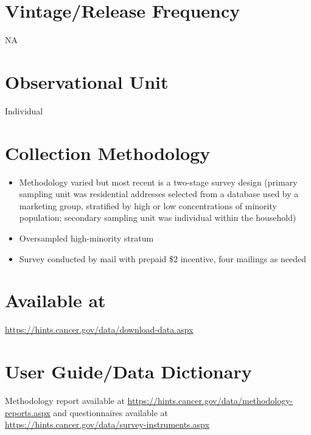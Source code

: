 \documentclass[
]{book}
\providecommand{\tightlist}{%
  \setlength{\itemsep}{0pt}\setlength{\parskip}{0pt}}
\begin{document}
\hypertarget{vintagerelease-frequency-31}{%
\section{Vintage/Release Frequency}\label{vintagerelease-frequency-31}}

NA

\hypertarget{observational-unit-31}{%
\section{Observational Unit}\label{observational-unit-31}}

Individual

\hypertarget{collection-methodology-31}{%
\section{Collection Methodology}\label{collection-methodology-31}}

\begin{itemize}
\tightlist
\item
  Methodology varied but most recent is a two-stage survey design (primary sampling unit was residential addresses selected from a database used by a marketing group, stratified by high or low concentrations of minority population; secondary sampling unit was individual within the household)
\item
  Oversampled high-minority stratum
\item
  Survey conducted by mail with prepaid \$2 incentive, four mailings as needed
\end{itemize}

\hypertarget{available-at-31}{%
\section{Available at}\label{available-at-31}}

\url{https://hints.cancer.gov/data/download-data.aspx}

\hypertarget{user-guidedata-dictionary-31}{%
\section{User Guide/Data Dictionary}\label{user-guidedata-dictionary-31}}

Methodology report available at \url{https://hints.cancer.gov/data/methodology-reports.aspx} and questionnaires available at \url{https://hints.cancer.gov/data/survey-instruments.aspx}
\end{document}
